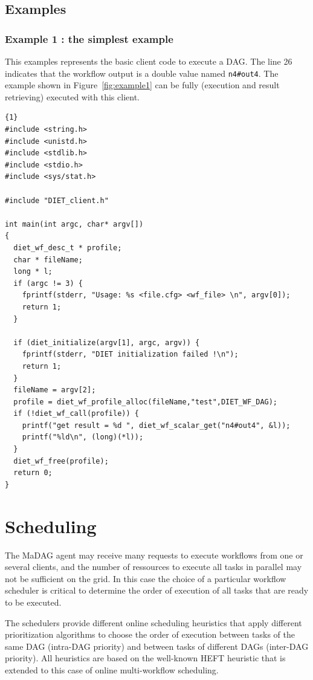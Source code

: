 \begin{itemize}
\subsection{Examples}
\label{sec:examples}

\subsubsection{Example 1 : the simplest example}
\label{sec:ex1}

This examples represents the basic client code to execute a DAG.
The line 26 indicates that the workflow output is a double value named
\verb|n4#out4|. The example shown in Figure~\ref{fig:example1} can be
fully (execution and result retrieving) executed with this client.

\begin{lstlisting}{1}
#include <string.h>
#include <unistd.h>
#include <stdlib.h>
#include <stdio.h>
#include <sys/stat.h>

#include "DIET_client.h"

int main(int argc, char* argv[])
{
  diet_wf_desc_t * profile;
  char * fileName;
  long * l;
  if (argc != 3) {
    fprintf(stderr, "Usage: %s <file.cfg> <wf_file> \n", argv[0]);
    return 1;
  }

  if (diet_initialize(argv[1], argc, argv)) {
    fprintf(stderr, "DIET initialization failed !\n");
    return 1;
  }
  fileName = argv[2];
  profile = diet_wf_profile_alloc(fileName,"test",DIET_WF_DAG);
  if (!diet_wf_call(profile)) {
    printf("get result = %d ", diet_wf_scalar_get("n4#out4", &l));
    printf("%ld\n", (long)(*l));
  }
  diet_wf_free(profile);
  return 0;
}
\end{lstlisting}

\section{Scheduling}
\label{sec:wf_sched}

The MaDAG agent may receive many requests to execute workflows from one or
several clients, and the number of ressources to execute all tasks in parallel
may not be sufficient on the grid. In this case the choice of a particular
workflow scheduler is critical to determine the order of execution of all
tasks that are ready to be executed.

The schedulers provide different online scheduling heuristics that apply
different prioritization algorithms to choose the order of execution
between tasks of the same DAG (intra-DAG priority) and between tasks of
different DAGs (inter-DAG priority). All heuristics are based on the well-known
HEFT heuristic that is extended to this case of online multi-workflow
scheduling.


\end{itemize}
